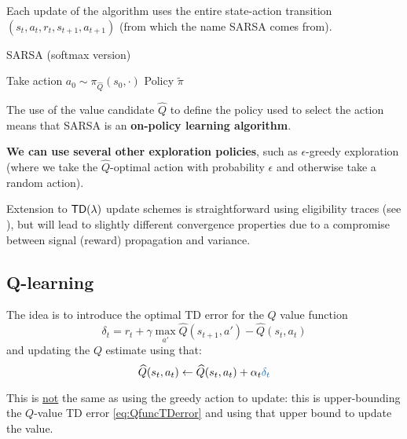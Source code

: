 \documentclass[../course-notes.tex]{subfiles}
\begin{document}
Each update of the algorithm uses the entire state-action transition $(s_t,a_t,r_t,s_{t+1},a_{t+1})$ (from which the name SARSA comes from).

\begin{algorithm}
	\caption{SARSA (softmax version)}
	Take action $a_0 \sim \pi_{\widehat{Q}}(s_0, \cdot)$\;
	\Return Policy $\tilde{\pi}$\;
\end{algorithm}


The use of the value candidate $\widehat{Q}$ to define the policy used to select the action means that SARSA is an \textbf{\bluefont on-policy learning algorithm}.

\textbf{We can use several other exploration policies}, such as $\epsilon$-greedy exploration (where we take the $\widehat{Q}$-optimal action with probability $\epsilon$ and otherwise take a random action).

Extension to $\mathsf{TD}(\lambda)$ update schemes is straightforward using eligibility traces (see \cite[chap.~12]{Sutton1998}), but will lead to slightly different convergence properties due to a compromise between signal (reward) propagation and variance.



\subsection{Q-learning}\label{sec:QLearning}

The idea is to introduce the optimal TD error for the $Q$ value function
\begin{equation}\label{eq:QlearnTDerror}
	\delta_t = r_t + \gamma \max_{a'}\widehat{Q}(s_{t+1},a') - \widehat{Q}(s_t,a_t)
\end{equation}
and updating the $Q$ estimate using that:
\[
	\widehat{Q}(s_t,a_t) \leftarrow \widehat{Q}(s_t,a_t) + \alpha_t {\bluefont\delta_t}
\]

This is \underline{not} the same as using the greedy action to update: this is upper-bounding the $Q$-value TD error \eqref{eq:QfuncTDerror} and using that upper bound to update the value.
\end{document}
